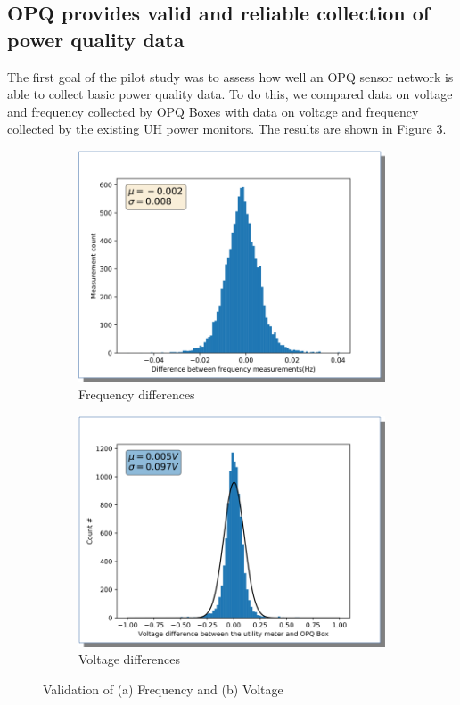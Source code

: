 \subsection{OPQ provides valid and reliable collection of power quality data}

The first goal of the pilot study was to assess how well an OPQ sensor network is able to collect basic power quality data. To do this, we compared data on voltage and frequency collected by OPQ Boxes with data on voltage and frequency collected by the existing UH power monitors.  The results are shown in Figure \ref{fig:opqbox-f-v-validation}.

\begin{figure}[ht]
	\centering
	\begin{subfigure}{.5\textwidth}
	  \centering
	  \includegraphics[width=0.9\linewidth]{images/pilot/opqbox-frequency-validation.png}
	  \caption{Frequency differences}
	  \label{fig:opqbox-validation-1}
	\end{subfigure}%
	\begin{subfigure}{.5\textwidth}
	  \centering
	  \includegraphics[width=0.9\linewidth]{images/pilot/opqbox-voltage-validation.png}
	  \caption{Voltage differences}
	  \label{fig:opqbox-validation-2}
	\end{subfigure}
	\caption{Validation of (a) Frequency and (b) Voltage}
	\label{fig:opqbox-f-v-validation}
\end{figure}


